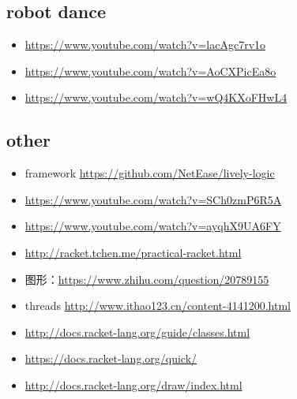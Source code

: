 \documentclass[9pt,b5paper]{article}
\begin{document}
\subsection{robot dance}
\label{sec-2-6}
\begin{itemize}
\item \url{https://www.youtube.com/watch?v=lacAgc7rv1o}
\item \url{https://www.youtube.com/watch?v=AoCXPicEa8o}
\item \url{https://www.youtube.com/watch?v=wQ4KXoFHwL4}
\end{itemize}

\subsection{other}
\label{sec-2-7}
\begin{itemize}
\item framework \url{https://github.com/NetEase/lively-logic}
\item \url{https://www.youtube.com/watch?v=SCh0zmP6R5A}
\item \url{https://www.youtube.com/watch?v=ayqhX9UA6FY}
\item \url{http://racket.tchen.me/practical-racket.html}
\item 图形：\url{https://www.zhihu.com/question/20789155}
\item threads \url{http://www.ithao123.cn/content-4141200.html}
\item \url{http://docs.racket-lang.org/guide/classes.html}
\item \url{https://docs.racket-lang.org/quick/}
\item \url{http://docs.racket-lang.org/draw/index.html}
\end{itemize}
\end{document}
